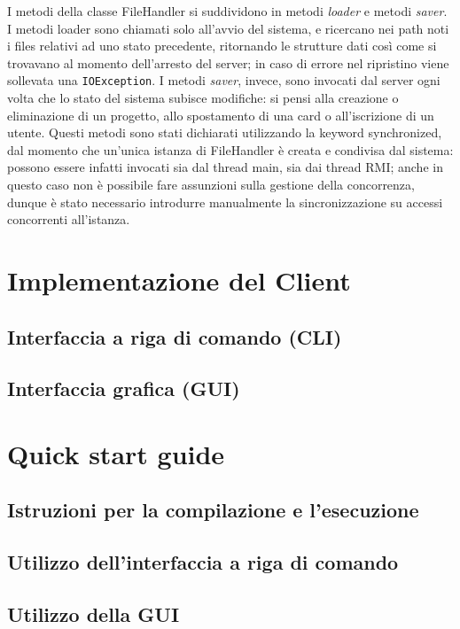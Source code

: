 \documentclass{article}
\begin{document}
I metodi della classe FileHandler si suddividono in metodi \emph{loader} e metodi \emph{saver}. I metodi loader sono chiamati solo all'avvio del sistema, e ricercano nei path noti i files relativi ad uno stato precedente, ritornando le strutture dati così come si trovavano al momento dell'arresto del server; in caso di errore nel ripristino viene sollevata una \texttt{IOException}. I metodi \emph{saver}, invece, sono invocati dal server ogni volta che lo stato del sistema subisce modifiche: si pensi alla creazione o eliminazione di un progetto, allo spostamento di una card o all'iscrizione di un utente. Questi metodi sono stati dichiarati utilizzando la keyword synchronized, dal momento che un'unica istanza di FileHandler è creata e condivisa dal sistema: possono essere infatti invocati sia dal thread main, sia dai thread RMI; anche in questo caso non è possibile fare assunzioni sulla gestione della concorrenza, dunque è stato necessario introdurre manualmente la sincronizzazione su accessi concorrenti all'istanza.




\newpage
\section{Implementazione del Client}
\subsection{Interfaccia a riga di comando (CLI)}
\subsection{Interfaccia grafica (GUI)}

\section{Quick start guide}
\subsection{Istruzioni per la compilazione e l'esecuzione}
\subsection{Utilizzo dell'interfaccia a riga di comando}
\subsection{Utilizzo della GUI}
\end{document}
